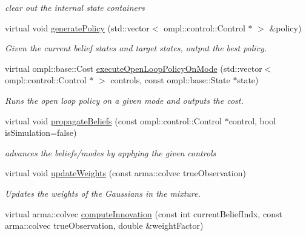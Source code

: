 \begin{DoxyCompactItemize}
\begin{DoxyCompactList}\small\item\em clear out the internal state containers \end{DoxyCompactList}\item 
virtual void \hyperlink{class_n_b_m3_p_ac2ea9419623bd0457607c0b21b1e9419}{generate\-Policy} (std\-::vector$<$ ompl\-::control\-::\-Control $\ast$ $>$ \&policy)
\begin{DoxyCompactList}\small\item\em Given the current belief states and target states, output the best policy. \end{DoxyCompactList}\item 
virtual ompl\-::base\-::\-Cost \hyperlink{class_n_b_m3_p_a8bcb9374834a923bac3e12442c99c758}{execute\-Open\-Loop\-Policy\-On\-Mode} (std\-::vector$<$ ompl\-::control\-::\-Control $\ast$ $>$ controls, const ompl\-::base\-::\-State $\ast$state)
\begin{DoxyCompactList}\small\item\em Runs the open loop policy on a given mode and outputs the cost. \end{DoxyCompactList}\item 
\hypertarget{class_n_b_m3_p_aabe6965cf94e0e48752c831d9d8210af}{virtual void \hyperlink{class_n_b_m3_p_aabe6965cf94e0e48752c831d9d8210af}{propagate\-Beliefs} (const ompl\-::control\-::\-Control $\ast$control, bool is\-Simulation=false)}\label{class_n_b_m3_p_aabe6965cf94e0e48752c831d9d8210af}

\begin{DoxyCompactList}\small\item\em advances the beliefs/modes by applying the given controls \end{DoxyCompactList}\item 
\hypertarget{class_n_b_m3_p_a9b8b1005e96ba553bc5726f4b29c79c1}{virtual void \hyperlink{class_n_b_m3_p_a9b8b1005e96ba553bc5726f4b29c79c1}{update\-Weights} (const arma\-::colvec true\-Observation)}\label{class_n_b_m3_p_a9b8b1005e96ba553bc5726f4b29c79c1}

\begin{DoxyCompactList}\small\item\em Updates the weights of the Gaussians in the mixture. \end{DoxyCompactList}\item 
\hypertarget{class_n_b_m3_p_a700d3b88a1868771feea8006cc5ce67d}{virtual arma\-::colvec \hyperlink{class_n_b_m3_p_a700d3b88a1868771feea8006cc5ce67d}{compute\-Innovation} (const int current\-Belief\-Indx, const arma\-::colvec true\-Observation, double \&weight\-Factor)}\label{class_n_b_m3_p_a700d3b88a1868771feea8006cc5ce67d}


\end{DoxyCompactItemize}
